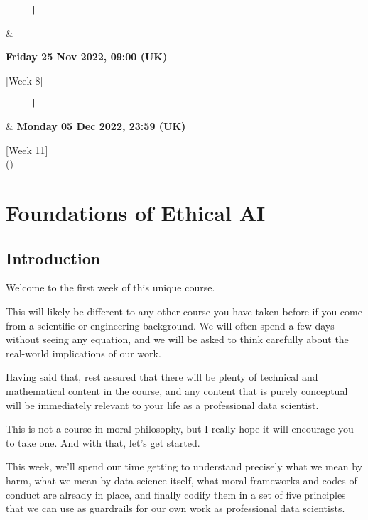 \documentclass[
]{book}
\theoremstyle{definition}
\theoremstyle{definition}
\theoremstyle{definition}
\theoremstyle{definition}
\theoremstyle{remark}
\begin{document}
\begin{longtable}[]
\begin{minipage}[t]{\linewidth}
\begin{verbatim}
     |
\end{verbatim}
\end{minipage} & \begin{minipage}[t]{\linewidth}\raggedright
\textbf{Friday
25 Nov
2022,
09:00
(UK)}

{[}Week 8{]}

\begin{verbatim}
     |
\end{verbatim}
\end{minipage} & \textbf{Monday
05 Dec
2022,
23:59
(UK)}

{[}Week 11{]} \\
\bottomrule()
\end{longtable}

\hypertarget{ch-foundations}{%
\chapter{Foundations of Ethical AI}\label{ch-foundations}}

\hypertarget{introduction}{%
\section*{Introduction}\label{introduction}}

Welcome to the first week of this unique course.

This will likely be different to any other course you have taken before if you come from a scientific or engineering background. We will often spend a few days without seeing any equation, and we will be asked to think carefully about the real-world implications of our work.

Having said that, rest assured that there will be plenty of technical and mathematical content in the course, and any content that is purely conceptual will be immediately relevant to your life as a professional data scientist.

This is not a course in moral philosophy, but I really hope it will encourage you to take one. And with that, let's get started.

This week, we'll spend our time getting to understand precisely what we mean by harm, what we mean by data science itself, what moral frameworks and codes of conduct are already in place, and finally codify them in a set of five principles that we can use as guardrails for our own work as professional data scientists.
\end{document}
